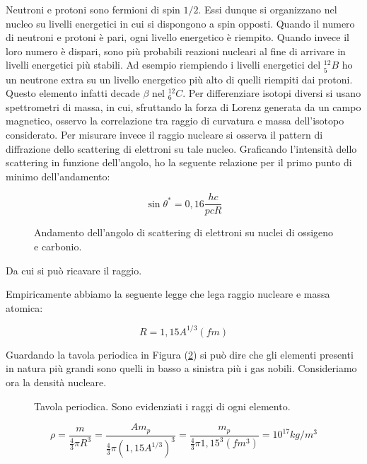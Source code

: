 Neutroni e protoni sono fermioni di spin $1/2$. Essi dunque si organizzano nel nucleo su livelli energetici in cui si dispongono a spin opposti.
Quando il numero di neutroni e protoni è pari, ogni livello energetico è riempito. Quando invece il loro numero è dispari, sono più probabili reazioni nucleari al fine di arrivare in livelli energetici più stabili. Ad esempio riempiendo i livelli energetici del $^{12}_5B$ ho un neutrone extra su un livello energetico più alto di quelli riempiti dai protoni. Questo elemento infatti decade $\beta$ nel $^{12}_6C$.
Per differenziare isotopi diversi si usano spettrometri di massa, in cui, sfruttando la forza di Lorenz generata da un campo magnetico, osservo la correlazione tra raggio di curvatura e massa dell'isotopo considerato.
Per misurare invece il raggio nucleare si osserva il pattern di diffrazione dello scattering di elettroni su tale nucleo. Graficando l'intensità dello scattering in funzione dell'angolo, ho la seguente relazione per il primo punto di minimo dell'andamento:

\begin{equation}
\sin \theta^*=0,16\frac{hc}{pcR}
\end{equation}

\begin{figure}
\centering
		\caption{Andamento dell'angolo di scattering di elettroni su nuclei di ossigeno e carbonio.}
         \label{scatteringatomicradius}
\end{figure}

Da cui si può ricavare il raggio.

Empiricamente abbiamo la seguente legge che lega raggio nucleare e massa atomica:

\begin{equation}
R=1,15A^{1/3} (fm)
\end{equation}

Guardando la tavola periodica in Figura (\ref{atomicradii}) si può dire che gli elementi presenti in natura più grandi sono quelli in basso a sinistra più i gas nobili.
Consideriamo ora la densità nucleare. 

\begin{figure}
\centering
		\caption{Tavola periodica. Sono evidenziati i raggi di ogni elemento.}
         \label{atomicradii}
\end{figure}

\begin{equation}
\rho=\frac{m}{\frac{4}{3}\pi R^3}=\frac{Am_p}{\frac{4}{3}\pi (1,15 A^{1/3})^3}=\frac{m_p}{\frac{4}{3}\pi 1,15^3 (fm^3)} = 10^{17} kg/m^3
\end{equation}

